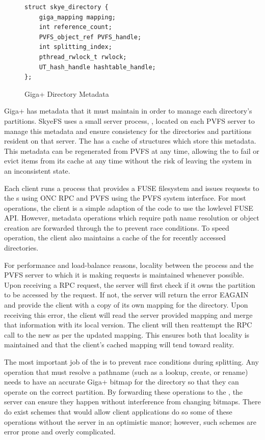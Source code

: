 \documentclass[onecolumn, 11pt, letterpaper]{article}
\begin{document}
\begin{figure}
\begin{lstlisting}
struct skye_directory {
    giga_mapping mapping;
    int reference_count;
    PVFS_object_ref PVFS_handle;
    int splitting_index;
    pthread_rwlock_t rwlock;
    UT_hash_handle hashtable_handle;
};
\end{lstlisting}
\caption{Giga+ Directory Metadata}
\label{fig:skyedir}
\end{figure}

Giga+ has metadata that it must maintain in order to manage each directory's
partitions.  SkyeFS uses a small server process, , located
on each PVFS server to manage this metadata and ensure consistency for the
directories and partitions resident on that server.  The 
has a cache of  structures which store this metadata.
This metadata can be regenerated from PVFS at any time, allowing the
 to fail or evict items from its cache at any time without
the risk of leaving the system in an inconsistent state.

Each client runs a  process that provides a FUSE filesystem
and issues requests to the s using ONC RPC and PVFS using
the PVFS system interface.\cite{rpc}  For most operations, the client is a simple
adaption of the  code to use the lowlevel FUSE API.  However,
metadata operations which require path name resolution or object creation are
forwarded through the  to prevent race conditions.  To
speed operation, the client also maintains a cache of the 
for recently accessed directories.

For performance and load-balance reasons, locality between the
 process and the PVFS server to which it is making
requests is maintained whenever possible.  Upon receiving a RPC request, the
server will first check if it owns the partition to be accessed by the
request.  If not, the server will return the error EAGAIN and provide
the client with a copy of its own mapping for the directory.  Upon receiving
this error, the client will read the server provided mapping and merge that
information with its local version.  The client will then reattempt the RPC
call to the new  as per the updated mapping.  This
ensures both that locality is maintained and that the client's cached mapping
will tend toward reality.

The most important job of the  is to prevent race
conditions during splitting.  Any operation that must resolve a pathname (such
as a lookup, create, or rename) needs to have an accurate Giga+ bitmap for the
directory so that they can operate on the correct partition.  By forwarding
these operations to the , the server can ensure they happen
without interference from changing bitmaps.  There do exist schemes that would
allow client applications do so some of these operations without the server in
an optimistic manor; however, such schemes are error prone and overly
complicated.
\end{document}
